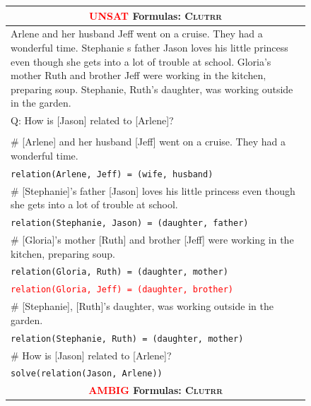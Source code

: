 \documentclass{article}
\theoremstyle{definition}
\newcommand{\clutrr}{\textsc{Clutrr}}
\begin{document}
\begin{figure}[h]
    \footnotesize
    \centering
    \begin{tabularx}{\linewidth}{X}
    \toprule
        \multicolumn{1}{c}{\bf \textcolor{red}{UNSAT} Formulas: \clutrr{}} \\
         \midrule
        Arlene and her husband Jeff went on a cruise. They had a wonderful time. Stephanie s father Jason loves his little princess even though she gets into a lot of trouble at school. Gloria's mother Ruth and brother Jeff were working in the kitchen, preparing soup. Stephanie, Ruth's daughter, was working outside in the garden. \\
Q: How is [Jason] related to [Arlene]?\\
\\
	\# [Arlene] and her husband [Jeff] went on a cruise. They had a wonderful time. \\
   \tt relation(Arlene, Jeff) = (wife, husband)\\
    \# [Stephanie]'s father [Jason] loves his little princess even though she gets into a lot of trouble at school.\\
  \tt  relation(Stephanie, Jason) = (daughter, father)\\
    \# [Gloria]'s mother [Ruth] and brother [Jeff] were working in the kitchen, preparing soup.\\
   \tt relation(Gloria, Ruth) = (daughter, mother)\\
    \tt \textcolor{red}{relation(Gloria, Jeff) = (daughter, brother)}\\
    \# [Stephanie], [Ruth]'s daughter, was working outside in the garden.\\
  \tt  relation(Stephanie, Ruth) = (daughter, mother)\\
    \# How is [Jason] related to [Arlene]?\\
   \tt solve(relation(Jason, Arlene))\\
    \midrule
    \multicolumn{1}{c}{\bf\textcolor{red}{AMBIG} Formulas: \clutrr{} } \\
    \midrule

\end{tabularx}
\end{figure}
\end{document}
